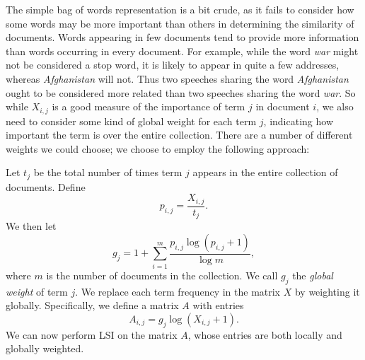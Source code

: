 The simple bag of words representation is a bit crude, as it fails to consider how some words may be more important than others
in determining the similarity of documents.
Words appearing in few documents tend
to provide more information than words occurring in every document.
For example, while the word \emph{war} might not be considered a stop word,
it is likely to appear in quite a few addresses, whereas \emph{Afghanistan} will not.
Thus two speeches sharing the word \emph{Afghanistan} ought to be considered more
related than two speeches sharing the word \emph{war}.
So while $X_{i,j}$ is a good measure of the importance of term $j$ in document $i$,
we also need to consider some kind of global weight for each term $j$,
indicating how important the term is over the entire collection.
There are a number of different weights we could choose; we choose to employ
the following approach:

Let $t_{j}$ be the total number of times term $j$ appears in the entire
collection of documents.
Define
\begin{equation*}
p_{i,j} = \frac{X_{i,j}}{t_{j}}.
\end{equation*}
We then let
\begin{equation*}
g_{j} = 1 + \sum_{i=1}^{m} \frac{p_{i,j} \log (p_{i,j} + 1)}{\log m},
\end{equation*}
where $m$ is the number of documents in the collection.
We call $g_{j}$ the \emph{global weight} of term $j$.
We replace each term frequency in the matrix $X$ by weighting it globally.
Specifically, we define a matrix $A$ with entries
\begin{equation*}
A_{i,j} = g_{j} \log (X_{i,j} + 1).
\end{equation*}
We can now perform LSI on the matrix $A$, whose entries are both locally and globally weighted.


